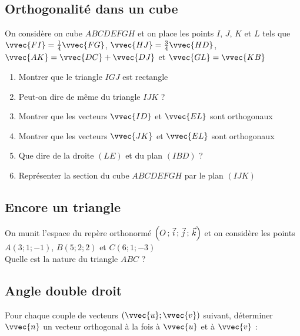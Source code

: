 \documentclass[oneside,12pt]{book}          %
\begin{document}
\subsection{Orthogonalité dans un cube}
On considère on cube $ABCDEFGH$ et on place les points $I$, $J$, $K$ et $L$ tels que $\vvec{FI}=\frac{1}{4}\vvec{FG} $, $\vvec{HJ}=\frac{3}{4}\vvec{HD} $, $\vvec{AK}=\vvec{DC}+\vvec{DJ}$ et $\vvec{GL}=\vvec{KB}$
\begin{enumerate}
	\item Montrer que le triangle $IGJ$ est rectangle
    \item Peut-on dire de même du triangle $IJK$ ?
    \item Montrer que les vecteurs $\vvec{ID}$ et $\vvec{EL}$ sont orthogonaux
    \item Montrer que les vecteurs $\vvec{JK}$ et $\vvec{EL}$ sont orthogonaux
    \item Que dire de la droite $(LE)$ et du plan $(IBD)$ ?
    \item Représenter la section du cube $ABCDEFGH$ par le plan $(IJK)$
\end{enumerate}



\subsection{Encore un triangle}
On munit l'espace du repère orthonormé $\left(O\,;\,\Vec{i}\,;\,\Vec{j}\,;\,\Vec{k}\right)$ et on considère les points $A(3;1;-1)$, $ B(5;2;2)$ et $C(6;1;-3)$\\
Quelle est la nature du triangle $ABC$ ?



\subsection{Angle double droit}
Pour chaque couple de vecteurs $(\vvec{u};\vvec{v})$ suivant, déterminer $\vvec{n}$ un vecteur orthogonal à la fois à $\vvec{u}$ et à $\vvec{v}$ :
\end{document}
